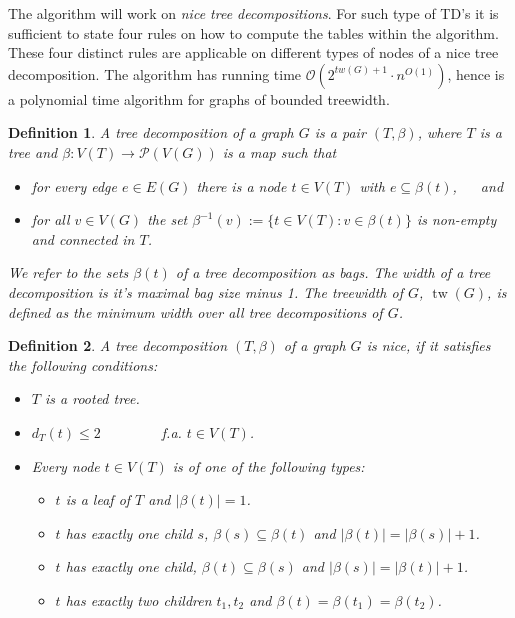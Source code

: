 \documentclass[11pt,a4paper]{article}
\newtheorem*{definition}{Definition}
\DeclareMathOperator{\tw}{tw}
\begin{document}
The algorithm will work on \emph{nice tree decompositions}. For such type of TD's it is sufficient to state four rules on how to compute the tables within the algorithm. These four distinct rules are applicable on different types of nodes of a nice tree decomposition. The algorithm has running time $\mathcal{O}(2^{tw(G)+1} \cdot n^{O(1)})$, hence is a polynomial time algorithm for graphs of bounded treewidth. \\ 

\begin{definition}
A \emph{tree decomposition} of a graph $G$ is a pair $(T, \beta)$, where $T$ is a tree and $\beta: V(T) \rightarrow \mathcal{P}(V(G))$ is a map such that
\begin{itemize}
\setlength{\itemindent}{.2in}
\item [(T1)] for every edge $e \in E(G)$ there is a node $t \in V(T)$ with $e \subseteq \beta(t)$, $\quad$ and 
\item [(T2)] for all $v \in V(G)$ the set $\beta^{-1}(v) := \{t \in V(T) : v \in \beta(t)\}$ is non-empty and connected in $T$.
\end{itemize}

\vspace*{2mm}

We refer to the sets $\beta(t)$ of a tree decomposition as \emph{bags}. The width of a tree decomposition is it's maximal bag size minus 1. The \emph{treewidth} of $G$, $\tw(G)$, is defined as the minimum width over all tree decompositions of $G$. \\
\end{definition}

\begin{definition}
A tree decomposition $(T, \beta)$ of a graph $G$ is \emph{nice}, if it satisfies the following conditions: 

\begin{itemize}
\item $T$ is a rooted tree.
\item $d_{T}(t) \leq 2 \qquad \qquad$ f.a. $t \in V(T)$.
\item Every node $t \in V(T)$ is of one of the following types:
\begin{itemize}
\item [\textbf{leaf}] $t$ is a leaf of $T$ and $|\beta(t)| = 1$.
\item [\textbf{introduce}] $t$ has exactly one child $s$, $\beta(s) \subseteq \beta(t)$ and $|\beta(t)| = |\beta(s)| + 1$.
\item [\textbf{forget}] $t$ has exactly one child, $\beta(t) \subseteq \beta(s)$ and $|\beta(s)| = |\beta(t)| + 1$.
\item [\textbf{join}] $t$ has exactly two children $t_{1}, t_{2}$ and $\beta(t) = \beta(t_{1}) = \beta(t_{2})$.
\end{itemize}
\end{itemize}
 
\end{definition}
\end{document}
